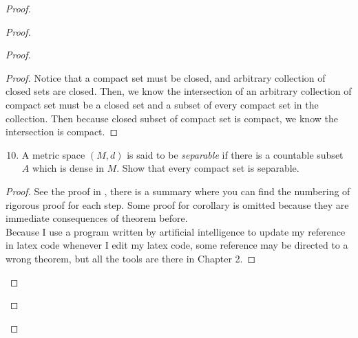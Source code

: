 \documentclass{report}
\begin{document}
\begin{proof}
\begin{proof}
\begin{proof}
\begin{proof}
Notice that a compact set must be closed, and arbitrary collection of closed sets are closed. Then, we know the intersection of an arbitrary collection of compact set must be a closed set and a subset of every compact set in the collection. Then because closed subset of compact set is compact, we know the intersection is compact.
\end{proof}
\begin{question}{}{}
\begin{enumerate}
    \setcounter{enumi}{9}
    \item A metric space \( (M,d) \) is said to be \textit{separable} if there is a countable subset \( A \) which is dense in \( M \). Show that every compact set is separable.
\end{enumerate}
\end{question}
\begin{proof}
See the proof in , there is a summary where you can find the numbering of rigorous proof for each step. Some proof for corollary is omitted because they are immediate consequences of theorem before.\\

Because I use a program written by artificial intelligence to update my reference in latex code whenever I edit my latex code, some reference may be directed to a wrong theorem, but all the tools are there in Chapter 2. 
\end{proof}

\end{proof}
\end{proof}
\end{proof}
\end{document}
